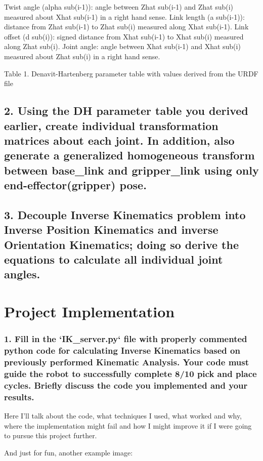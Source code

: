 \documentclass{article}
\begin{document}
Twist angle (alpha sub(i-1)): angle between Zhat sub(i-1) and Zhat sub(i) measured about Xhat sub(i-1) in a right hand sense.
Link length (a sub(i-1)): distance from Zhat sub(i-1) to Zhat sub(i) measured along Xhat sub(i-1).
Link offset (d sub(i)): signed distance from Xhat sub(i-1) to Xhat sub(i) measured along Zhat sub(i).
Joint angle: angle between Xhat sub(i-1) and Xhat sub(i) measured about Zhat sub(i) in a right hand sense.

Table 1. Denavit-Hartenberg parameter table with values derived from the URDF file

\subsection{2. Using the DH parameter table you derived earlier, create individual transformation matrices about each joint. In addition, also generate a generalized homogeneous transform between base\_link and gripper\_link using only end-effector(gripper) pose.}


\subsection{3. Decouple Inverse Kinematics problem into Inverse Position Kinematics and inverse Orientation Kinematics; doing so derive the equations to calculate all individual joint angles.}



\section{Project Implementation}

\subsubsection{1. Fill in the `IK\_server.py` file with properly commented python code for calculating Inverse Kinematics based on previously performed Kinematic Analysis. Your code must guide the robot to successfully complete 8/10 pick and place cycles. Briefly discuss the code you implemented and your results.}


Here I'll talk about the code, what techniques I used, what worked and why, where the implementation might fail and how I might improve it if I were going to pursue this project further.  


And just for fun, another example image:
\end{document}

